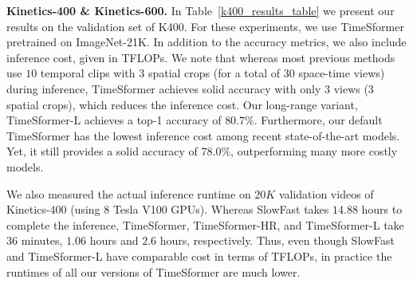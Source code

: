 \documentclass{article}
\begin{document}




\textbf{Kinetics-400 \& Kinetics-600.} In Table~\ref{k400_results_table} we present our results on the validation set of K400. For these experiments, we use TimeSformer pretrained on ImageNet-21K. In addition to the accuracy metrics, we also include inference cost, given in TFLOPs. We note that whereas most previous methods use $10$ temporal clips with $3$ spatial crops (for a total of $30$ space-time views) during inference, TimeSformer achieves solid accuracy with only $3$ views (3 spatial crops), which reduces the inference cost. Our long-range variant, TimeSformer-L achieves a top-1 accuracy of $80.7\%$. Furthermore, our default TimeSformer has the lowest inference cost among recent state-of-the-art models. Yet, it still provides a solid accuracy of $78.0\%$, outperforming many more costly models. 

We also measured the actual inference runtime on $20K$ validation videos of Kinetics-400 (using $8$ Tesla V100 GPUs). Whereas SlowFast takes $14.88$ hours to complete the inference, TimeSformer, TimeSformer-HR, and TimeSformer-L take $36$ minutes, $1.06$ hours and $2.6$ hours, respectively. Thus, even though SlowFast and TimeSformer-L have comparable cost in terms of TFLOPs, in practice the runtimes of all our versions of TimeSformer are much lower. 
\end{document}
